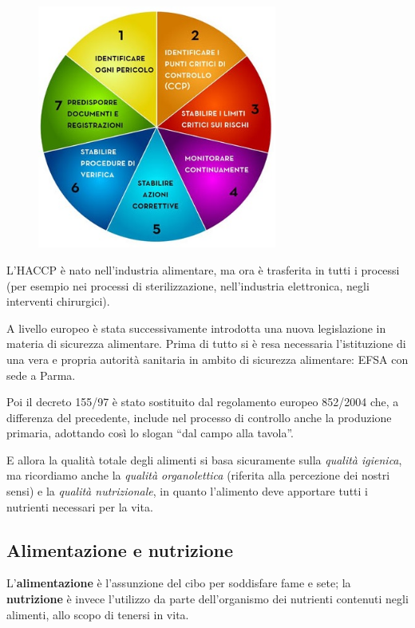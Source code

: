 \begin{figure}[!ht]
\centering
	\includegraphics[width=0.7\textwidth]{20/image3.jpeg}
	\end{figure}

L'HACCP è nato nell'industria alimentare, ma ora è trasferita in tutti i
processi (per esempio nei processi di sterilizzazione, nell'industria
elettronica, negli interventi chirurgici).

A livello europeo è stata successivamente introdotta una nuova
legislazione in materia di sicurezza alimentare. Prima di tutto si è
resa necessaria l'istituzione di una vera e propria autorità sanitaria
in ambito di sicurezza alimentare: EFSA con sede a Parma.

Poi il decreto 155/97 è stato sostituito dal regolamento europeo
852/2004 che, a differenza del precedente, include nel processo di
controllo anche la produzione primaria, adottando così lo slogan ``dal
campo alla tavola''.

E allora la qualità totale degli alimenti si basa sicuramente sulla
\emph{qualità igienica}, ma ricordiamo anche la \emph{qualità
organolettica} (riferita alla percezione dei nostri sensi) e la
\emph{qualità nutrizionale}, in quanto l'alimento deve apportare tutti i
nutrienti necessari per la vita.

\subsection{Alimentazione e nutrizione}

L'\textbf{alimentazione} è l'assunzione del cibo per soddisfare fame e
sete; la \textbf{nutrizione} è invece l'utilizzo da parte dell'organismo
dei nutrienti contenuti negli alimenti, allo scopo di tenersi in vita.

